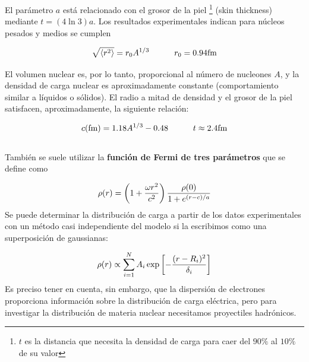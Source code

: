 El parámetro $a$ está relacionado con el grosor de la piel \footnote{$t$ es la distancia que necesita la densidad de carga para caer del $90\%$ al $10\%$ de su valor} (skin thickness) mediante $t=(4\ln 3)a$. Los resultados experimentales indican para núcleos pesados y medios se cumplen 

\begin{equation}
	\sqrt{\langle r^2 \rangle} = r_0 A^{1/3} \tquad r_0 = 0.94 \unit{\fm}
\end{equation}



El volumen nuclear es, por lo tanto, proporcional al número de nucleones $A$, y la densidad de carga nuclear es aproximadamente constante (comportamiento similar a líquidos o sólidos). El radio a mitad de densidad y el grosor de la piel satisfacen, aproximadamente, la siguiente relación:

\begin{equation}
    c(\unit{\fm}) = 1.18A^{1/3} - 0.48 \tquad t \approx 2.4 \unit{\fm}
\end{equation} \\

También se suele utilizar la \textbf{función de Fermi de tres parámetros} que se define como

\begin{equation}
    \rho (r) = \left( 1+ \frac{\omega r^2}{c^2} \right) \frac{\rho (0)}{1+e^{(r-c)/a}} 
\end{equation}
Se puede determinar la distribución de carga a partir de los datos experimentales con un método casi independiente del modelo si la escribimos como una superposición de gaussianas:

\begin{equation}
	\rho (r) \propto \sum_{i=1}^N A_i \exp \left[ - \frac{(r-R_i)^2}{\delta_i} \right]
\end{equation}
Es preciso tener en cuenta, sin embargo, que la dispersión de electrones proporciona información sobre la distribución de carga eléctrica, pero para investigar la distribución de materia nuclear necesitamos proyectiles hadrónicos.

